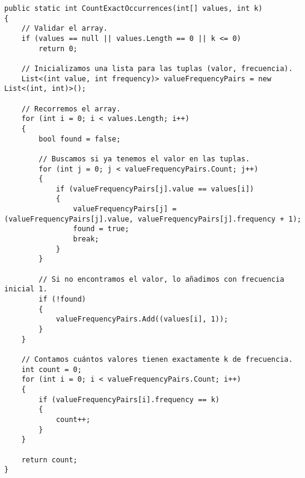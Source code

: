 \begin{lstlisting}
public static int CountExactOccurrences(int[] values, int k)
{
    // Validar el array.
    if (values == null || values.Length == 0 || k <= 0)
        return 0;

    // Inicializamos una lista para las tuplas (valor, frecuencia).
    List<(int value, int frequency)> valueFrequencyPairs = new List<(int, int)>();

    // Recorremos el array.
    for (int i = 0; i < values.Length; i++)
    {
        bool found = false;

        // Buscamos si ya tenemos el valor en las tuplas.
        for (int j = 0; j < valueFrequencyPairs.Count; j++)
        {
            if (valueFrequencyPairs[j].value == values[i])
            {
                valueFrequencyPairs[j] = (valueFrequencyPairs[j].value, valueFrequencyPairs[j].frequency + 1);
                found = true;
                break;
            }
        }

        // Si no encontramos el valor, lo añadimos con frecuencia inicial 1.
        if (!found)
        {
            valueFrequencyPairs.Add((values[i], 1));
        }
    }

    // Contamos cuántos valores tienen exactamente k de frecuencia.
    int count = 0;
    for (int i = 0; i < valueFrequencyPairs.Count; i++)
    {
        if (valueFrequencyPairs[i].frequency == k)
        {
            count++;
        }
    }

    return count;
}
\end{lstlisting}
